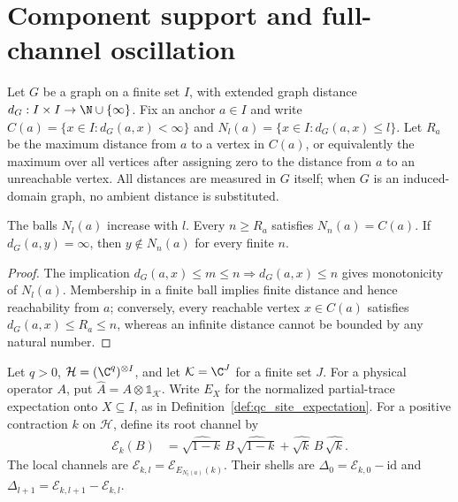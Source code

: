 
\section{Component support and full-channel oscillation}
\label{sec:qc_component_channel}

Let $G$ be a graph on a finite set $I$, with extended graph distance
$d_G:I\times I\to\N\cup\{\infty\}$. Fix an anchor $a\in I$ and write
$C(a)=\{x\in I:d_G(a,x)<\infty\}$ and
$N_l(a)=\{x\in I:d_G(a,x)\le l\}$.
Let $R_a$ be the maximum distance from $a$ to a vertex in $C(a)$, or
equivalently the maximum over all vertices after assigning zero to the
distance from $a$ to an unreachable vertex.
All distances are measured in $G$ itself; when $G$ is an induced-domain
graph, no ambient distance is substituted.

\begin{lemma}
    \label{thm:qc_graph_ball_stabilization}
    \leanok
    The balls $N_l(a)$ increase with $l$. Every $n\ge R_a$ satisfies
    $N_n(a)=C(a)$. If $d_G(a,y)=\infty$, then $y\notin N_n(a)$ for
    every finite $n$.
\end{lemma}
\begin{proof}
    \leanok
    The implication $d_G(a,x)\le m\le n\Rightarrow d_G(a,x)\le n$
    gives monotonicity of $N_l(a)$. Membership in a finite ball implies finite
    distance and hence reachability from $a$; conversely, every reachable
    vertex $x\in C(a)$ satisfies $d_G(a,x)\le R_a\le n$, whereas an infinite
    distance cannot be bounded by any natural number.
\end{proof}

Let $q>0$, $\mathcal H=(\C^q)^{\otimes I}$, and let
$\mathcal K=\C^J$ for a finite set $J$.
For a physical operator $A$, put
$\widehat A=A\otimes\mathbb 1_{\mathcal K}$.
Write $E_X$ for the normalized partial-trace expectation onto
$X\subseteq I$, as in Definition~\ref{def:qc_site_expectation}.
For a positive contraction $k$ on $\mathcal H$, define its root channel by
\begin{align}
    \mathcal E_k(B)
     & =\widehat{\sqrt{1-k}}\,B\,\widehat{\sqrt{1-k}}
    +\widehat{\sqrt{k}}\,B\,\widehat{\sqrt{k}}.
    \label{eq:qc_component_root_channel}
\end{align}
The local channels are $\mathcal E_{k,l}=\mathcal E_{E_{N_l(a)}(k)}$.
Their shells are $\Delta_0=\mathcal E_{k,0}-\mathrm{id}$ and
$\Delta_{l+1}=\mathcal E_{k,l+1}-\mathcal E_{k,l}$.

